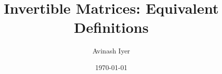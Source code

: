 \documentclass{beamer}
\title{Invertible Matrices: Equivalent Definitions}
\author{Avinash Iyer}
\institute{Occidental College}
\date{\today} %
\begin{document}
\begin{frame}
    \titlepage
\end{frame}

\end{document}
